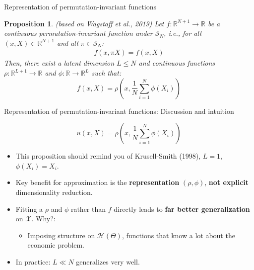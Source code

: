 \documentclass[aspectratio=169,10pt]{beamer}
\newcommand{\emphcolor}[1]{\textbf{\textcolor{emphcolorval}{#1}}}
\newtheorem{proposition}{Proposition}
\newcommand{\Xdom}{\mathcal{X}}
\begin{document}
\begin{frame}{Representation of permutation-invariant functions }
		
			\begin{proposition}{ (based on Wagstaff et al., 2019)}
				Let  $f:\mathbb{R}^{N+1} \rightarrow \mathbb{R}$ be a continuous permutation-invariant function under $\mathcal{S}_N$, i.e., for all $(x,X) \in \mathbb{R}^{N+1}$ and all $\pi \in \mathcal{S}_N$:
				\begin{align*}
					f(x, \pi X) = f(x,X)
				\end{align*}
				Then, there exist a latent dimension $L\leq N$ and continuous functions $\rho : \mathbb{R}^{L+1}\rightarrow \mathbb{R}$ and $\phi: \mathbb{R} \rightarrow \mathbb{R}^L$ such that:
				\begin{equation*}
					f(x,X) = \rho \left(x,\frac{1}{N}\sum_{i=1}^N\phi(X_i)\right)
				\end{equation*}
				\vspace{-0.1in}
			\end{proposition}
		\end{frame}
	
	
	\begin{frame}[label = symmetry]{Representation of permutation-invariant functions: Discussion and intuition}
		
		
		$$u(x,X) = \rho\left(x,\frac{1}{N} \sum_{i=1}^N\phi(X_i)\right)$$
			\begin{itemize}
				\item This proposition should remind you of Krusell-Smith (1998), $L =1$, $\phi(X_i) = X_i$. \vspace{0.1 in}
				\item Key benefit for approximation is the \emphcolor{representation} $(\rho,\phi)$,\vspace{0.1 in} \emphcolor{not explicit} dimensionality reduction.
				\smallskip
				\item Fitting a $\rho$ and $\phi$ rather than $f$ directly leads to \emphcolor{far better generalization} on $\Xdom$. Why?:\vspace{0.1 in}
				\smallskip
				\begin{itemize}
					\item Imposing structure on $\mathcal{H}(\Theta)$, functions that know a lot about the economic problem.\vspace{0.1 in}
				\end{itemize}
				\item In practice: $L\ll N$  generalizes very well. \hyperlink{Reg-example}{}
			\end{itemize}
	
	\end{frame}
	
\end{document}
